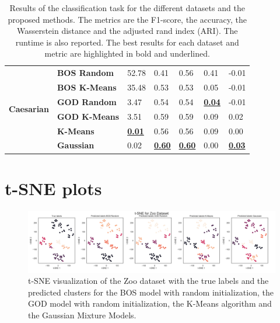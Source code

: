 \documentclass[a4paper,12pt]{article}
\newcommand{\tm}[1]{\todo[inline,color=orange!40]{{\textbf{TM:}~}#1}}
\begin{document}
\begin{table}
\begin{adjustbox}{width=\columnwidth}
\begin{tabular}{lllllll}
\cline{1-7}
\multirow[t]{6}{*}{\textbf{Caesarian}} & \textbf{BOS Random} & 52.78 & 0.41 & 0.56 & 0.41 & -0.01 \\
\textbf{} & \textbf{BOS K-Means} & 35.48 & 0.53 & 0.53 & 0.05 & -0.01 \\
\textbf{} & \textbf{GOD Random} & 3.47 & 0.54 & 0.54 & \textbf{\underline{0.04}} & -0.01 \\
\textbf{} & \textbf{GOD K-Means} & 3.51 & 0.59 & 0.59 & 0.09 & 0.02 \\
\textbf{} & \textbf{K-Means} & \textbf{\underline{0.01}} & 0.56 & 0.56 & 0.09 & 0.00 \\
\textbf{} & \textbf{Gaussian} & 0.02 & \textbf{\underline{0.60}} & \textbf{\underline{0.60}} & 0.00 & \textbf{\underline{0.03}} \\
\cline{1-7}
\bottomrule
\end{tabular}
\end{adjustbox}
\caption{
Results of the classification task for the different datasets and the proposed methods. 
The metrics are the F1-score, the accuracy, the Wasserstein distance and the adjusted rand index (ARI). 
The runtime is also reported. 
The best results for each dataset and metric are highlighted in bold and underlined. 
}
\label{tab:results_real}
\end{table}

\section{t-SNE plots}
\label{sec:appendix_tsne}
\begin{figure}[H]
    \centering
    \includegraphics[width=\textwidth]{Attachments/tsne_zoo.png}
    \caption{t-SNE visualization of the Zoo dataset with the true labels and the predicted clusters for the BOS model with random initialization, the GOD model with random initialization, the K-Means algorithm and the Gaussian Mixture Models.}
    \label{fig:tsne_zoo}
\end{figure}
\end{document}
